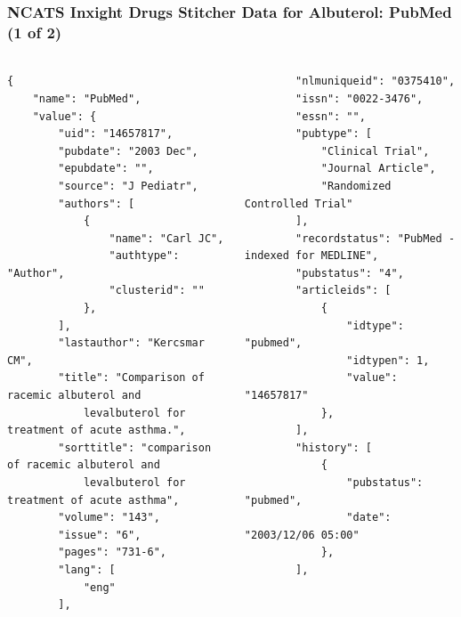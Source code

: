 \documentclass[aspectratio=169,xcolor=dvipsnames]{beamer}
\begin{document}
\begin{frame}[fragile,t]
  \frametitle{NCATS Inxight Drugs Stitcher Data for Albuterol: PubMed (1 of 2)}
  \framesubtitle{}
  \tiny
  \begin{columns}[t]
    \begin{column}{0.5\textwidth}
\begin{verbatim}
{
    "name": "PubMed",
    "value": {
        "uid": "14657817",
        "pubdate": "2003 Dec",
        "epubdate": "",
        "source": "J Pediatr",
        "authors": [
            {
                "name": "Carl JC",
                "authtype": "Author",
                "clusterid": ""
            },
        ],
        "lastauthor": "Kercsmar CM",
        "title": "Comparison of racemic albuterol and
            levalbuterol for treatment of acute asthma.",
        "sorttitle": "comparison of racemic albuterol and
            levalbuterol for treatment of acute asthma",
        "volume": "143",
        "issue": "6",
        "pages": "731-6",
        "lang": [
            "eng"
        ],
\end{verbatim}
    \end{column}
    \begin{column}{0.5\textwidth}
\begin{verbatim}
        "nlmuniqueid": "0375410",
        "issn": "0022-3476",
        "essn": "",
        "pubtype": [
            "Clinical Trial",
            "Journal Article",
            "Randomized Controlled Trial"
        ],
        "recordstatus": "PubMed - indexed for MEDLINE",
        "pubstatus": "4",
        "articleids": [
            {
                "idtype": "pubmed",
                "idtypen": 1,
                "value": "14657817"
            },
        ],
        "history": [
            {
                "pubstatus": "pubmed",
                "date": "2003/12/06 05:00"
            },
        ],
\end{verbatim}
    \end{column}
  \end{columns}
\end{frame}
\end{document}
